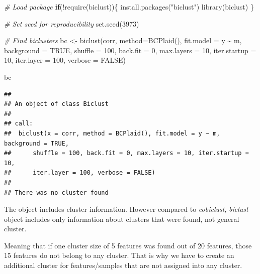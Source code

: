 \documentclass[
]{book}
\newenvironment{Shaded}{\begin{snugshade}}{\end{snugshade}}
\newcommand{\AttributeTok}[1]{\textcolor[rgb]{0.77,0.63,0.00}{#1}}
\newcommand{\CommentTok}[1]{\textcolor[rgb]{0.56,0.35,0.01}{\textit{#1}}}
\newcommand{\ConstantTok}[1]{\textcolor[rgb]{0.00,0.00,0.00}{#1}}
\newcommand{\ControlFlowTok}[1]{\textcolor[rgb]{0.13,0.29,0.53}{\textbf{#1}}}
\newcommand{\DecValTok}[1]{\textcolor[rgb]{0.00,0.00,0.81}{#1}}
\newcommand{\FunctionTok}[1]{\textcolor[rgb]{0.00,0.00,0.00}{#1}}
\newcommand{\NormalTok}[1]{#1}
\newcommand{\OtherTok}[1]{\textcolor[rgb]{0.56,0.35,0.01}{#1}}
\newcommand{\SpecialCharTok}[1]{\textcolor[rgb]{0.00,0.00,0.00}{#1}}
\newcommand{\StringTok}[1]{\textcolor[rgb]{0.31,0.60,0.02}{#1}}
\begin{document}
\begin{Shaded}
\begin{Highlighting}[]
\CommentTok{\# Load package}
\ControlFlowTok{if}\NormalTok{(}\SpecialCharTok{!}\FunctionTok{require}\NormalTok{(biclust))\{}
    \FunctionTok{install.packages}\NormalTok{(}\StringTok{"biclust"}\NormalTok{)}
    \FunctionTok{library}\NormalTok{(biclust)}
\NormalTok{\}}

\CommentTok{\# Set seed for reproducibility}
\FunctionTok{set.seed}\NormalTok{(}\DecValTok{3973}\NormalTok{)}

\CommentTok{\# Find biclusters}
\NormalTok{bc }\OtherTok{\textless{}{-}} \FunctionTok{biclust}\NormalTok{(corr, }\AttributeTok{method=}\FunctionTok{BCPlaid}\NormalTok{(), }\AttributeTok{fit.model =}\NormalTok{ y }\SpecialCharTok{\textasciitilde{}}\NormalTok{ m,}
              \AttributeTok{background =} \ConstantTok{TRUE}\NormalTok{, }\AttributeTok{shuffle =} \DecValTok{100}\NormalTok{, }\AttributeTok{back.fit =} \DecValTok{0}\NormalTok{, }\AttributeTok{max.layers =} \DecValTok{10}\NormalTok{,}
              \AttributeTok{iter.startup =} \DecValTok{10}\NormalTok{, }\AttributeTok{iter.layer =} \DecValTok{100}\NormalTok{, }\AttributeTok{verbose =} \ConstantTok{FALSE}\NormalTok{)}

\NormalTok{bc}
\end{Highlighting}
\end{Shaded}

\begin{verbatim}
## 
## An object of class Biclust 
## 
## call:
##  biclust(x = corr, method = BCPlaid(), fit.model = y ~ m, background = TRUE, 
##      shuffle = 100, back.fit = 0, max.layers = 10, iter.startup = 10, 
##      iter.layer = 100, verbose = FALSE)
## 
## There was no cluster found
\end{verbatim}

The object includes cluster information. However compared to
\emph{cobiclust}, \emph{biclust} object includes only information about clusters
that were found, not general cluster.

Meaning that if one cluster size of 5 features was found out of 20 features,
those 15 features do not belong to any cluster. That is why we have to create an
additional cluster for features/samples that are not assigned into any cluster.
\end{document}
